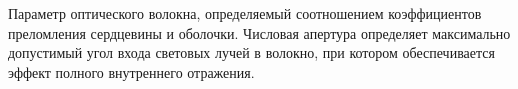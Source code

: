 Параметр оптического волокна, определяемый соотношением
коэффициентов преломления сердцевины и оболочки. Числовая 
апертура определяет максимально допустимый угол входа световых
лучей в волокно, при котором обеспечивается эффект полного
внутреннего отражения.